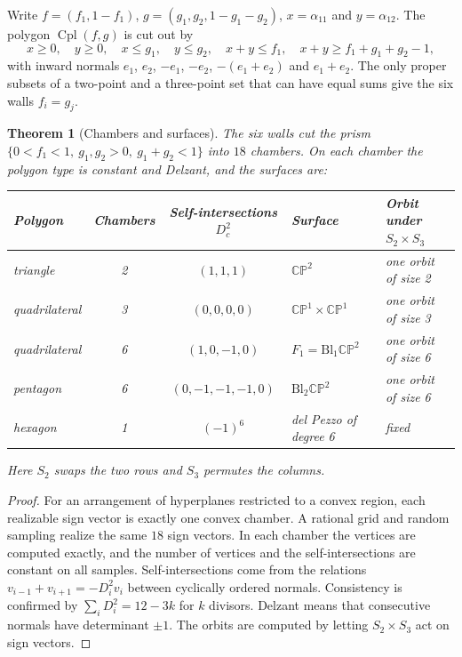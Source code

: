 \documentclass[11pt]{article}
\newtheorem{theorem}{Theorem}[section]
\theoremstyle{definition}
\theoremstyle{remark}
\newcommand{\Cpl}{\operatorname{Cpl}}
\newcommand{\CP}{\mathbb{CP}}
\begin{document}
Write $f=(f_1,1-f_1)$, $g=(g_1,g_2,1-g_1-g_2)$, $x=\alpha_{11}$ and $y=\alpha_{12}$. The polygon
$\Cpl(f,g)$ is cut out by
\[
x\ge0,\quad y\ge0,\quad x\le g_1,\quad y\le g_2,\quad x+y\le f_1,\quad x+y\ge f_1+g_1+g_2-1,
\]
with inward normals $e_1$, $e_2$, $-e_1$, $-e_2$, $-(e_1+e_2)$ and $e_1+e_2$. The only proper subsets of a
two-point and a three-point set that can have equal sums give the six walls $f_i=g_j$.

\begin{theorem}[Chambers and surfaces]\label{thm:chambers}
The six walls cut the prism $\{0<f_1<1,\ g_1,g_2>0,\ g_1+g_2<1\}$ into $18$ chambers. On each chamber
the polygon type is constant and Delzant, and the surfaces are:
\begin{center}\small
\begin{tabular}{@{}lccll@{}}
\toprule
Polygon & Chambers & Self-intersections $D_c^2$ & Surface & Orbit under $S_2\times S_3$\\
\midrule
triangle & 2 & $(1,1,1)$ & $\CP^2$ & one orbit of size 2\\
quadrilateral & 3 & $(0,0,0,0)$ & $\CP^1\times\CP^1$ & one orbit of size 3\\
quadrilateral & 6 & $(1,0,-1,0)$ & $F_1=\mathrm{Bl}_1\CP^2$ & one orbit of size 6\\
pentagon & 6 & $(0,-1,-1,-1,0)$ & $\mathrm{Bl}_2\CP^2$ & one orbit of size 6\\
hexagon & 1 & $(-1)^6$ & del Pezzo of degree 6 & fixed\\
\bottomrule
\end{tabular}
\end{center}
Here $S_2$ swaps the two rows and $S_3$ permutes the columns.
\end{theorem}
\begin{proof}
For an arrangement of hyperplanes restricted to a convex region, each realizable sign vector is exactly
one convex chamber. A rational grid and random sampling realize the same $18$ sign vectors. In each
chamber the vertices are computed exactly, and the number of vertices and the self-intersections are
constant on all samples. Self-intersections come from the relations $v_{i-1}+v_{i+1}=-D_i^2v_i$
between cyclically ordered normals. Consistency is confirmed by $\sum_iD_i^2=12-3k$ for $k$ divisors.
Delzant means that consecutive normals have determinant $\pm1$. The orbits are computed by letting
$S_2\times S_3$ act on sign vectors.
\end{proof}
\end{document}
